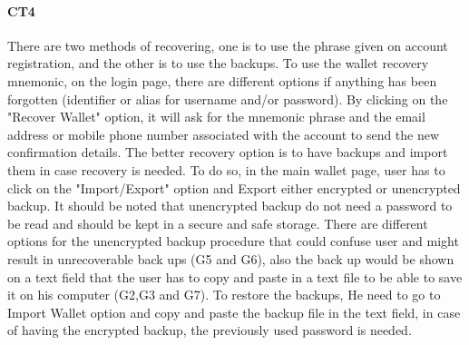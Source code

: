 \paragraph{CT4} There are two methods of recovering, one is to use the phrase given on account registration, and the other is to use the backups. To use the wallet recovery mnemonic, on the login page, there are different options if anything has been forgotten (identifier or alias for username and/or password). By clicking on the "Recover Wallet" option, it will ask for the mnemonic phrase and the email address or mobile phone number associated with the account to send the new confirmation details. The better recovery option is to have backups and import them in case recovery is needed. To do so, in the main wallet page, user has to click on the "Import/Export" option and Export either encrypted or unencrypted backup. It should be noted that unencrypted backup do not need a password to be read and should be kept in a secure and safe storage. There are different options for the unencrypted backup procedure that could confuse user and might result in unrecoverable back ups (G5 and G6), also the back up would be shown on a text field that the user has to copy and paste in a text file to be able to save it on his computer (G2,G3 and G7). To restore the backups, He need to go to Import Wallet option and copy and paste the backup file in the text field, in case of having the encrypted backup, the previously used password is needed.
